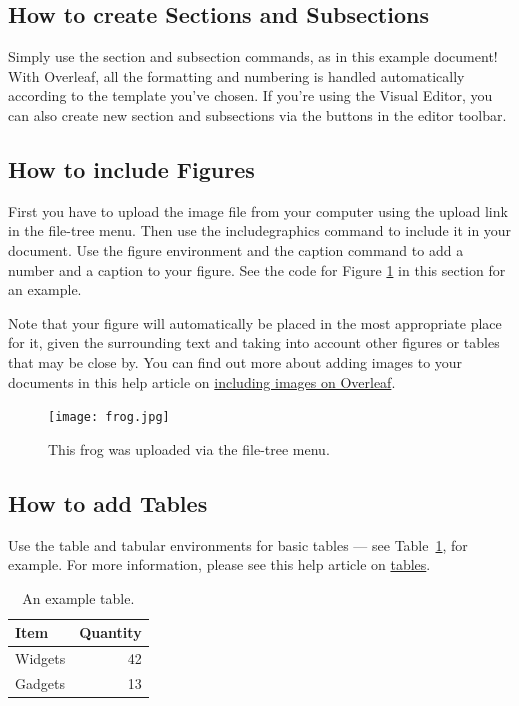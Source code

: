 \documentclass{article}
\begin{document}
\subsection{How to create Sections and Subsections}

Simply use the section and subsection commands, as in this example document! With Overleaf, all the formatting and numbering is handled automatically according to the template you've chosen. If you're using the Visual Editor, you can also create new section and subsections via the buttons in the editor toolbar.

\subsection{How to include Figures}

First you have to upload the image file from your computer using the upload link in the file-tree menu. Then use the includegraphics command to include it in your document. Use the figure environment and the caption command to add a number and a caption to your figure. See the code for Figure \ref{fig:frog} in this section for an example.

Note that your figure will automatically be placed in the most appropriate place for it, given the surrounding text and taking into account other figures or tables that may be close by. You can find out more about adding images to your documents in this help article on \href{https://www.overleaf.com/learn/how-to/Including_images_on_Overleaf}{including images on Overleaf}.

\begin{figure}
\centering
\texttt{[image: frog.jpg]}
\caption{\label{fig:frog}This frog was uploaded via the file-tree menu.}
\end{figure}

\subsection{How to add Tables}

Use the table and tabular environments for basic tables --- see Table~\ref{tab:widgets}, for example. For more information, please see this help article on \href{https://www.overleaf.com/learn/latex/tables}{tables}. 

\begin{table}
\centering
\begin{tabular}{l|r}
Item & Quantity \\\hline
Widgets & 42 \\
Gadgets & 13
\end{tabular}
\caption{\label{tab:widgets}An example table.}
\end{table}
\end{document}

